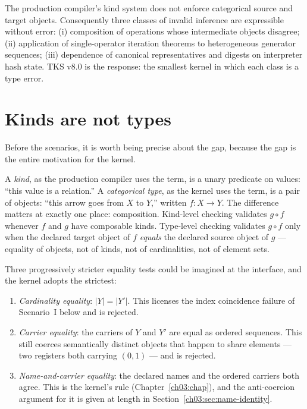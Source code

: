 \begin{finding}\label{ch01:finding:audit}
The production compiler's kind system does not enforce categorical source and
target objects. Consequently three classes of invalid inference are
expressible without error: (i) composition of operations whose intermediate
objects disagree; (ii) application of single-operator iteration theorems to
heterogeneous generator sequences; (iii) dependence of canonical
representatives and digests on interpreter hash state. TKS v8.0 is the
response: the smallest kernel in which each class is a type error.
\end{finding}

\section{Kinds are not types}\label{ch01:sec:kinds}

Before the scenarios, it is worth being precise about the gap, because the gap
is the entire motivation for the kernel.

A \emph{kind}, as the production compiler uses the term, is a unary predicate
on values: ``this value is a relation.'' A \emph{categorical type}, as the
kernel uses the term, is a pair of objects: ``this arrow goes from $X$ to
$Y$,'' written $f : X \to Y$. The difference matters at exactly one place:
composition. Kind-level checking validates $g \circ f$ whenever $f$ and $g$
have composable kinds. Type-level checking validates $g \circ f$ only when
the declared target object of $f$ \emph{equals} the declared source object of
$g$ --- equality of objects, not of kinds, not of cardinalities, not of
element sets.

Three progressively stricter equality tests could be imagined at the
interface, and the kernel adopts the strictest:

\begin{enumerate}
\item \emph{Cardinality equality}: $|Y| = |Y'|$. This licenses the index
coincidence failure of Scenario~I below and is rejected.
\item \emph{Carrier equality}: the carriers of $Y$ and $Y'$ are equal as
ordered sequences. This still coerces semantically distinct objects that
happen to share elements --- two registers both carrying $(0,1)$ --- and is
rejected.
\item \emph{Name-and-carrier equality}: the declared names and the ordered
carriers both agree. This is the kernel's rule
(Chapter~\ref{ch03:chap}), and the anti-coercion argument for it is given at
length in Section~\ref{ch03:sec:name-identity}.
\end{enumerate}

